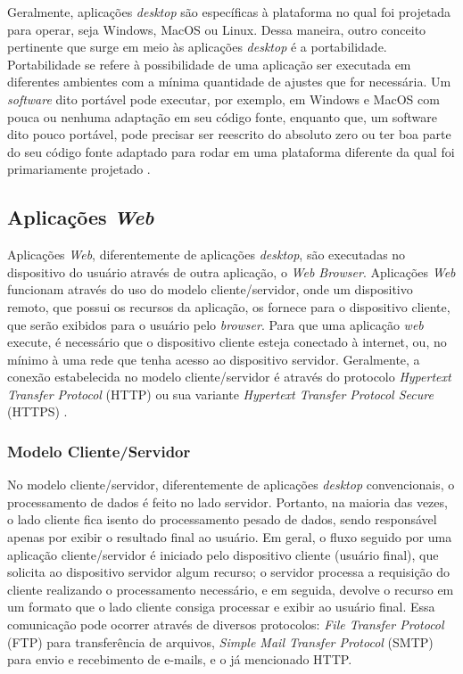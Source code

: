 Geralmente, aplicações \textit{desktop} são específicas à plataforma no qual foi projetada para operar, seja Windows, MacOS ou Linux. Dessa maneira, outro conceito pertinente que surge em meio às aplicações \textit{desktop} é a portabilidade. Portabilidade se refere à possibilidade de uma aplicação ser executada em diferentes ambientes com a mínima quantidade de ajustes que for necessária. Um \textit{software} dito portável pode executar, por exemplo, em Windows e MacOS com pouca ou nenhuma adaptação em seu código fonte, enquanto que, um software dito pouco portável, pode precisar ser reescrito do absoluto zero ou ter boa parte do seu código fonte adaptado para rodar em uma plataforma diferente da qual foi primariamente projetado \cite{tanenbaum1978guidelines}.

\subsection{Aplicações \textit{Web}}

Aplicações \textit{Web}, diferentemente de aplicações \textit{desktop}, são executadas no dispositivo do usuário através de outra aplicação, o \textit{Web Browser}. Aplicações \textit{Web} funcionam através do uso do modelo cliente/servidor, onde um dispositivo remoto, que possui os recursos da aplicação, os fornece para o dispositivo cliente, que serão exibidos para o usuário pelo \textit{browser}. Para que uma aplicação \textit{web} execute, é necessário que o dispositivo cliente esteja conectado à internet, ou, no mínimo à uma rede que tenha acesso ao dispositivo servidor. Geralmente, a conexão estabelecida no modelo cliente/servidor é através do protocolo \textit{Hypertext Transfer Protocol} (HTTP) ou sua variante \textit{Hypertext Transfer Protocol Secure} (HTTPS) \cite{conallen1999modeling}.

\subsubsection{Modelo Cliente/Servidor}

No modelo cliente/servidor, diferentemente de aplicações \textit{desktop} convencionais, o processamento de dados é feito no lado servidor. Portanto, na maioria das vezes, o lado cliente fica isento do processamento pesado de dados, sendo responsável apenas por exibir o resultado final ao usuário. Em geral, o fluxo seguido por uma aplicação cliente/servidor é iniciado pelo dispositivo cliente (usuário final), que solicita ao dispositivo servidor algum recurso; o servidor processa a requisição do cliente realizando o processamento necessário, e em seguida, devolve o recurso em um formato que o lado cliente consiga processar e exibir ao usuário final. Essa comunicação pode ocorrer através de diversos protocolos: \textit{File Transfer Protocol} (FTP) para transferência de arquivos, \textit{Simple Mail Transfer Protocol} (SMTP) para envio e recebimento de e-mails, e o já mencionado HTTP.

